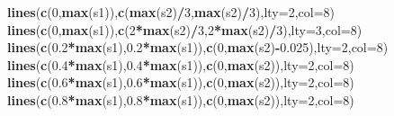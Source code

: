 \documentclass[]{article}
\newenvironment{Shaded}{\begin{snugshade}}{\end{snugshade}}
\newcommand{\DataTypeTok}[1]{\textcolor[rgb]{0.13,0.29,0.53}{#1}}
\newcommand{\DecValTok}[1]{\textcolor[rgb]{0.00,0.00,0.81}{#1}}
\newcommand{\FloatTok}[1]{\textcolor[rgb]{0.00,0.00,0.81}{#1}}
\newcommand{\KeywordTok}[1]{\textcolor[rgb]{0.13,0.29,0.53}{\textbf{#1}}}
\newcommand{\NormalTok}[1]{#1}
\newcommand{\OperatorTok}[1]{\textcolor[rgb]{0.81,0.36,0.00}{\textbf{#1}}}
\begin{document}
\begin{Shaded}
\begin{Highlighting}[]
\KeywordTok{lines}\NormalTok{(}\KeywordTok{c}\NormalTok{(}\DecValTok{0}\NormalTok{,}\KeywordTok{max}\NormalTok{(s1)),}\KeywordTok{c}\NormalTok{(}\KeywordTok{max}\NormalTok{(s2)}\OperatorTok{/}\DecValTok{3}\NormalTok{,}\KeywordTok{max}\NormalTok{(s2)}\OperatorTok{/}\DecValTok{3}\NormalTok{),}\DataTypeTok{lty=}\DecValTok{2}\NormalTok{,}\DataTypeTok{col=}\DecValTok{8}\NormalTok{)}
\KeywordTok{lines}\NormalTok{(}\KeywordTok{c}\NormalTok{(}\DecValTok{0}\NormalTok{,}\KeywordTok{max}\NormalTok{(s1)),}\KeywordTok{c}\NormalTok{(}\DecValTok{2}\OperatorTok{*}\KeywordTok{max}\NormalTok{(s2)}\OperatorTok{/}\DecValTok{3}\NormalTok{,}\DecValTok{2}\OperatorTok{*}\KeywordTok{max}\NormalTok{(s2)}\OperatorTok{/}\DecValTok{3}\NormalTok{),}\DataTypeTok{lty=}\DecValTok{3}\NormalTok{,}\DataTypeTok{col=}\DecValTok{8}\NormalTok{)}
\KeywordTok{lines}\NormalTok{(}\KeywordTok{c}\NormalTok{(}\FloatTok{0.2}\OperatorTok{*}\KeywordTok{max}\NormalTok{(s1),}\FloatTok{0.2}\OperatorTok{*}\KeywordTok{max}\NormalTok{(s1)),}\KeywordTok{c}\NormalTok{(}\DecValTok{0}\NormalTok{,}\KeywordTok{max}\NormalTok{(s2)}\OperatorTok{-}\FloatTok{0.025}\NormalTok{),}\DataTypeTok{lty=}\DecValTok{2}\NormalTok{,}\DataTypeTok{col=}\DecValTok{8}\NormalTok{)}
\KeywordTok{lines}\NormalTok{(}\KeywordTok{c}\NormalTok{(}\FloatTok{0.4}\OperatorTok{*}\KeywordTok{max}\NormalTok{(s1),}\FloatTok{0.4}\OperatorTok{*}\KeywordTok{max}\NormalTok{(s1)),}\KeywordTok{c}\NormalTok{(}\DecValTok{0}\NormalTok{,}\KeywordTok{max}\NormalTok{(s2)),}\DataTypeTok{lty=}\DecValTok{2}\NormalTok{,}\DataTypeTok{col=}\DecValTok{8}\NormalTok{)}
\KeywordTok{lines}\NormalTok{(}\KeywordTok{c}\NormalTok{(}\FloatTok{0.6}\OperatorTok{*}\KeywordTok{max}\NormalTok{(s1),}\FloatTok{0.6}\OperatorTok{*}\KeywordTok{max}\NormalTok{(s1)),}\KeywordTok{c}\NormalTok{(}\DecValTok{0}\NormalTok{,}\KeywordTok{max}\NormalTok{(s2)),}\DataTypeTok{lty=}\DecValTok{2}\NormalTok{,}\DataTypeTok{col=}\DecValTok{8}\NormalTok{)}
\KeywordTok{lines}\NormalTok{(}\KeywordTok{c}\NormalTok{(}\FloatTok{0.8}\OperatorTok{*}\KeywordTok{max}\NormalTok{(s1),}\FloatTok{0.8}\OperatorTok{*}\KeywordTok{max}\NormalTok{(s1)),}\KeywordTok{c}\NormalTok{(}\DecValTok{0}\NormalTok{,}\KeywordTok{max}\NormalTok{(s2)),}\DataTypeTok{lty=}\DecValTok{2}\NormalTok{,}\DataTypeTok{col=}\DecValTok{8}\NormalTok{)}


\end{Highlighting}
\end{Shaded}
\end{document}
